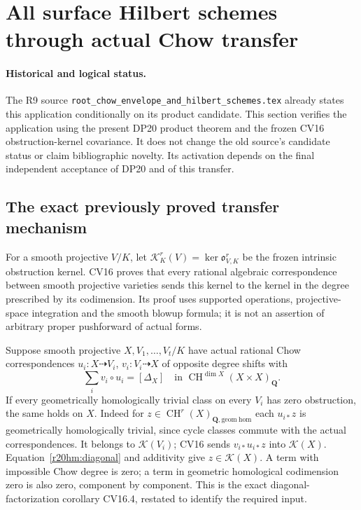 \section{All surface Hilbert schemes through actual Chow transfer}
\label{r20hm:section}

\paragraph{Historical and logical status.}
The R9 source \texttt{root\_chow\_envelope\_and\_hilbert\_schemes.tex}
already states this application conditionally on its product
candidate.  This section verifies the application using the
present DP20 product theorem and the frozen CV16 obstruction-kernel
covariance.  It does not change the old source's candidate status
or claim bibliographic novelty.  Its activation depends on the
final independent acceptance of DP20 and of this transfer.

\subsection{The exact previously proved transfer mechanism}

For a smooth projective $V/K$, let
$\mathcal K_K^r(V)=\ker\mathfrak o_{V,K}^r$ be the frozen
intrinsic obstruction kernel.  CV16 proves that every rational
algebraic correspondence between smooth projective varieties
sends this kernel to the kernel in the degree prescribed by
its codimension.  Its proof uses supported operations,
projective-space integration and the smooth blowup formula;
it is not an assertion of arbitrary proper pushforward of
actual forms.

Suppose smooth projective $X,V_1,\ldots,V_t/K$ have actual
rational Chow correspondences $u_i:X\dashrightarrow V_i$,
$v_i:V_i\dashrightarrow X$ of opposite degree shifts with
\[
 \sum_i v_i\circ u_i=[\Delta_X]
 \quad\text{in }\operatorname{CH}^{\dim X}(X\times X)_{\mathbf Q}.
 \tag{HM20.1}\label{r20hm:diagonal}
\]
If every geometrically homologically trivial class on every
$V_i$ has zero obstruction, the same holds on $X$.
Indeed for $z\in\operatorname{CH}^r(X)_{\mathbf Q,\mathrm{geom\ hom}}$
each $u_{i*}z$ is geometrically homologically trivial, since
cycle classes commute with the actual correspondences.
It belongs to $\mathcal K(V_i)$; CV16 sends $v_{i*}u_{i*}z$
into $\mathcal K(X)$.  Equation~\eqref{r20hm:diagonal}
and additivity give $z\in\mathcal K(X)$.  A term with
impossible Chow degree is zero; a term in geometric
homological codimension zero is also zero, component by
component.  This is the exact diagonal-factorization
corollary CV16.4, restated to identify the required input.

